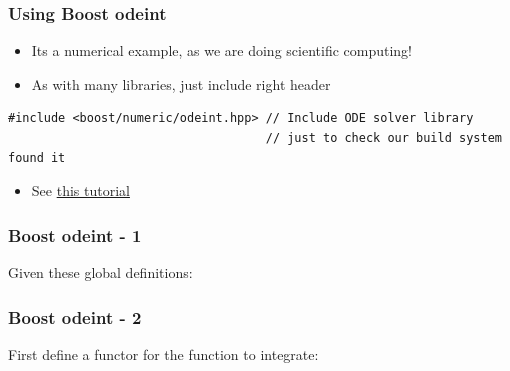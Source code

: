 \subsubsection{Using Boost odeint}\label{using-boost-odeint}

\begin{itemize}
\itemsep1pt\parskip0pt
\item
  Its a numerical example, as we are doing scientific computing!
\item
  As with many libraries, just include right header
\end{itemize}

\begin{verbatim}
#include <boost/numeric/odeint.hpp> // Include ODE solver library
                                    // just to check our build system found it
\end{verbatim}

\begin{itemize}
\itemsep1pt\parskip0pt
\item
  See
  \href{http://www.boost.org/doc/libs/1_57_0/libs/type_traits/doc/html/boost_typetraits/background.html}{this
  tutorial}
\end{itemize}

\subsubsection{Boost odeint - 1}\label{boost-odeint---1}

Given these global definitions:

\begin{Shaded}
\begin{Highlighting}[]

  \NormalTok{;}
  

\end{Highlighting}
\end{Shaded}

\subsubsection{Boost odeint - 2}\label{boost-odeint---2}

First define a functor for the function to integrate:

